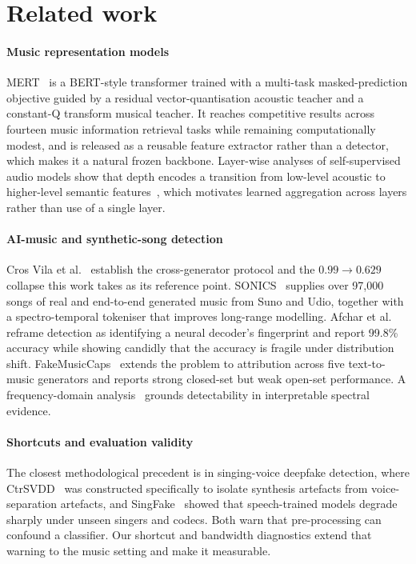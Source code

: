 \section{Related work}
\label{sec:related}

\paragraph{Music representation models}
MERT~\cite{li2024mert} is a BERT-style transformer trained with a multi-task
masked-prediction objective guided by a residual vector-quantisation acoustic
teacher and a constant-Q transform musical teacher. It reaches competitive
results across fourteen music information retrieval tasks while remaining
computationally modest, and is released as a reusable feature extractor rather
than a detector, which makes it a natural frozen backbone. Layer-wise analyses
of self-supervised audio models show that depth encodes a transition from
low-level acoustic to higher-level semantic features~\cite{elkheir2025}, which
motivates learned aggregation across layers rather than use of a single layer.

\paragraph{AI-music and synthetic-song detection}
Cros Vila et al.~\cite{crosvila2025} establish the cross-generator protocol and
the $0.99 \rightarrow 0.629$ collapse this work takes as its reference point.
SONICS~\cite{rahman2025sonics} supplies over 97{,}000 songs of real and
end-to-end generated music from Suno and Udio, together with a spectro-temporal
tokeniser that improves long-range modelling. Afchar et al.~\cite{afchar2025icassp}
reframe detection as identifying a neural decoder's fingerprint and report 99.8\%
accuracy while showing candidly that the accuracy is fragile under distribution
shift. FakeMusicCaps~\cite{comanducci2025} extends the problem to attribution
across five text-to-music generators and reports strong closed-set but weak
open-set performance. A frequency-domain analysis~\cite{afchar2025ismir} grounds
detectability in interpretable spectral evidence.

\paragraph{Shortcuts and evaluation validity}
The closest methodological precedent is in singing-voice deepfake detection,
where CtrSVDD~\cite{zang2024ctrsvdd} was constructed specifically to isolate
synthesis artefacts from voice-separation artefacts, and SingFake~\cite{zang2024singfake}
showed that speech-trained models degrade sharply under unseen singers and
codecs. Both warn that pre-processing can confound a classifier. Our shortcut
and bandwidth diagnostics extend that warning to the music setting and make it
measurable.

